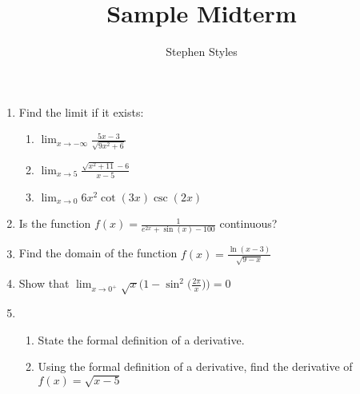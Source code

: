 \documentclass[12pt]{article}
\title{Sample Midterm}
\author{Stephen Styles}
\theoremstyle{remark}
\begin{document}
\maketitle

\begin{enumerate}

\item Find the limit if it exists:
\begin{enumerate}

\item $\displaystyle{\lim_{x \rightarrow -\infty} \frac{5x-3}{\sqrt{9x^2+6}}}$
\vspace{5cm}

\item $\displaystyle{\lim_{x \rightarrow 5} \frac{\sqrt{x^2+11}-6}{x-5}}$
\vspace{5cm}

\item $\displaystyle{\lim_{x \rightarrow 0} 6x^2 \cot(3x) \csc(2x)}$
\end{enumerate}
\newpage

\item Is the function $\displaystyle{ f(x) = \frac{1}{e^{2x}+\sin(x)-100}}$ continuous?
\vspace{5cm}

\item Find the domain of the function $\displaystyle{ f(x) = \frac{\ln(x-3)}{\sqrt{9-x}}}$
\vspace{5cm}

\item Show that $\displaystyle{\lim_{x \rightarrow 0^+} \sqrt{x}\bigg( 1 - \sin^2\bigg(\frac{2\pi}{x}\bigg)\bigg)=0}$
\newpage

\item \begin{enumerate}
\item State the formal definition of a derivative.
\vspace{3cm}
\item Using the formal definition of a derivative, find the derivative of $\displaystyle{f(x) = \sqrt{x-5}}$
\end{enumerate}
\newpage


\end{enumerate}
\end{document}

